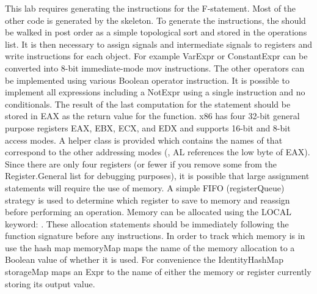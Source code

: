 %
This lab requires generating the instructions for the F-statement. Most of the other code is generated by the skeleton. To generate the instructions, the \AST should be walked in post order as a simple topological sort and stored in the operations list. It is then necessary to assign signals and intermediate signals to registers and write instructions for each \AST object. For example VarExpr or ConstantExpr can be converted into 8-bit immediate-mode mov instructions. The other operators can be implemented using various Boolean operator instruction. It is possible to implement all expressions including a NotExpr using a single instruction and no conditionals. The result of the last computation for the statement should be stored in EAX as the return value for the function. x86 has four 32-bit general purpose registers EAX, EBX, ECX, and EDX and supports 16-bit and 8-bit access modes. A helper class is provided which contains the names of that correspond to the other addressing modes (\ie, AL references the low byte of EAX). 
%
Since there are only four registers (or fewer if you remove some from the Register.General list for debugging purposes), it is possible that large assignment statements will require the use of memory. A simple FIFO (registerQueue) strategy is used to determine which register to save to memory and reassign before performing an operation. Memory can be allocated using the LOCAL keyword: . These allocation statements should be immediately following the function signature before any instructions. In order to track which memory is in use the hash map memoryMap maps the name of the memory allocation to a Boolean value of whether it is used. For convenience the IdentityHashMap storageMap maps an Expr to the name of either the memory or register currently storing its output value.


